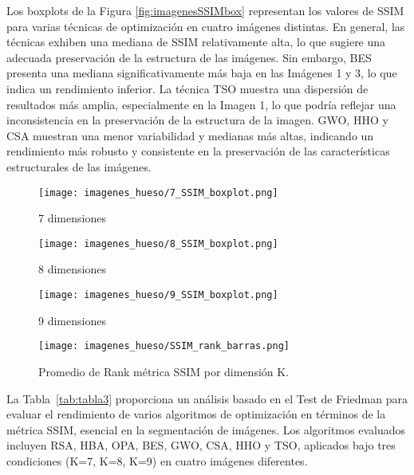 \documentclass[conference]{IEEEtran}
\begin{document}
\noindent Los boxplots de la Figura \ref{fig:imagenesSSIMbox} representan los valores de SSIM para varias técnicas de optimización en cuatro imágenes distintas. En general, las técnicas exhiben una mediana de SSIM relativamente alta, lo que sugiere una adecuada preservación de la estructura de las imágenes. Sin embargo, BES presenta una mediana significativamente más baja en las Imágenes 1 y 3, lo que indica un rendimiento inferior. La técnica TSO muestra una dispersión de resultados más amplia, especialmente en la Imagen 1, lo que podría reflejar una inconsistencia en la preservación de la estructura de la imagen. GWO, HHO y CSA muestran una menor variabilidad y medianas más altas, indicando un rendimiento más robusto y consistente en la preservación de las características estructurales de las imágenes.

\begin{figure*}[!t]
  \centering
  \begin{subfigure}{0.3\textwidth}
    \texttt{[image: imagenes\_hueso/7\_SSIM\_boxplot.png]}
    \caption{7 dimensiones}
    \label{subfig:fig1111}
  \end{subfigure}
  \hfil
  \begin{subfigure}{0.3\textwidth}
    \texttt{[image: imagenes\_hueso/8\_SSIM\_boxplot.png]}
    \caption{8 dimensiones}
    \label{subfig:fig2111}
  \end{subfigure}
  \hfil
  \begin{subfigure}{0.3\textwidth}
    \texttt{[image: imagenes\_hueso/9\_SSIM\_boxplot.png]}
    \caption{9 dimensiones}
    \label{subfig:fig3111}
  \end{subfigure}
  \caption{Boxplot de la métrica SSIM.}
  \label{fig:imagenesSSIMbox}
\end{figure*}

\begin{figure}[!htb]
    \centering
    \texttt{[image: imagenes\_hueso/SSIM\_rank\_barras.png]}
    \caption{Promedio de Rank métrica SSIM por dimensión K.}
    \label{fig:fig512}
\end{figure}


\noindent La Tabla~\ref{tab:tabla3} proporciona un análisis basado en el Test de Friedman para evaluar el rendimiento de varios algoritmos de optimización en términos de la métrica SSIM, esencial en la segmentación de imágenes. Los algoritmos evaluados incluyen RSA, HBA, OPA, BES, GWO, CSA, HHO y TSO, aplicados bajo tres condiciones (K=7, K=8, K=9) en cuatro imágenes diferentes. 
\end{document}

